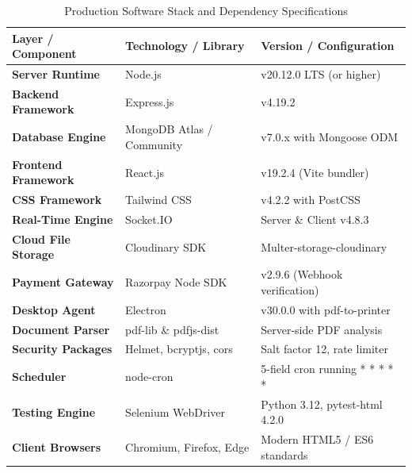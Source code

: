 \documentclass[12pt,a4paper,oneside]{report}
\begin{document}
\begin{table}[H]
\centering
\small
\begin{tabularx}{\textwidth}{|p{1.2in}|p{1.3in}|X|}
\hline
\textbf{Layer / Component} & \textbf{Technology / Library} & \textbf{Version / Configuration} \\ \hline
\textbf{Server Runtime} & Node.js & v20.12.0 LTS (or higher) \\ \hline
\textbf{Backend Framework} & Express.js & v4.19.2 \\ \hline
\textbf{Database Engine} & MongoDB Atlas / Community & v7.0.x with Mongoose ODM \\ \hline
\textbf{Frontend Framework} & React.js & v19.2.4 (Vite bundler) \\ \hline
\textbf{CSS Framework} & Tailwind CSS & v4.2.2 with PostCSS \\ \hline
\textbf{Real-Time Engine} & Socket.IO & Server \& Client v4.8.3 \\ \hline
\textbf{Cloud File Storage} & Cloudinary SDK & Multer-storage-cloudinary \\ \hline
\textbf{Payment Gateway} & Razorpay Node SDK & v2.9.6 (Webhook verification) \\ \hline
\textbf{Desktop Agent} & Electron & v30.0.0 with pdf-to-printer \\ \hline
\textbf{Document Parser} & pdf-lib \& pdfjs-dist & Server-side PDF analysis \\ \hline
\textbf{Security Packages} & Helmet, bcryptjs, cors & Salt factor 12, rate limiter \\ \hline
\textbf{Scheduler} & node-cron & 5-field cron running * * * * * \\ \hline
\textbf{Testing Engine} & Selenium WebDriver & Python 3.12, pytest-html 4.2.0 \\ \hline
\textbf{Client Browsers} & Chromium, Firefox, Edge & Modern HTML5 / ES6 standards \\ \hline
\end{tabularx}
\caption{Production Software Stack and Dependency Specifications}
\label{tab:software_reqs}
\end{table}
\end{document}
